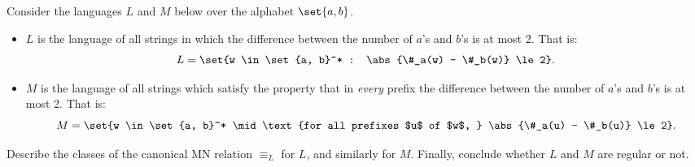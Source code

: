 \documentclass[12pt]{article}
\begin{document}
\begin{problem*}
    Consider the languages $L$ and $M$ below over the alphabet $\set{a, b}$.
    \begin{itemize}
        \item $L$ is the language of all strings in which the difference
        between the number of $a$'s and $b$'s is at most 2.
        That is: \[
            L = \set{w \in \set{a, b}^* : \abs{\#_a(w) - \#_b(w)} \le 2}.
        \]
        \item $M$ is the language of all strings which satisfy the property
        that in \emph{every} prefix the difference between the number of
        $a$'s and $b$'s is at most 2.
        That is: \[
            M = \set{w \in \set{a, b}^* \mid
                \text{for all prefixes $u$ of $w$, }
                \abs{\#_a(u) - \#_b(u)} \le 2}.
        \]
    \end{itemize}
    Describe the classes of the canonical MN relation $\equiv_L$ for $L$,
    and similarly for $M$.
    Finally, conclude whether $L$ and $M$ are regular or not.
\end{problem*}
\end{document}
